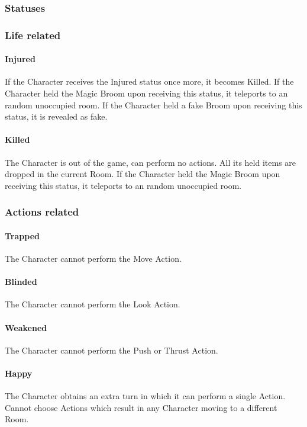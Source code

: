 \subsubsection{Statuses}

\subsubsection{Life related}

\paragraph{Injured} If the Character receives the Injured status once more, it becomes Killed. 
If the Character held the Magic Broom upon receiving this status, it teleports to an random unoccupied room. 
If the Character held a fake Broom upon receiving this status, it is revealed as fake.

\paragraph{Killed} The Character is out of the game, can perform no actions. All its held items are dropped in the current Room.
If the Character held the Magic Broom upon receiving this status, it teleports to an random unoccupied room. 

\subsubsection{Actions related}

\paragraph{Trapped} The Character cannot perform the Move Action.
\paragraph{Blinded} The Character cannot perform the Look Action.
\paragraph{Weakened} The Character cannot perform the Push or Thrust Action.

\paragraph{Happy} The Character obtains an extra turn in which it can perform a single Action. Cannot choose Actions which result in any Character moving to a different Room.

